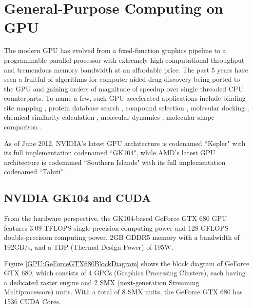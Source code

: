 \section{General-Purpose Computing on GPU}

The modern GPU has evolved from a fixed-function graphics pipeline to a programmable parallel processor with extremely high computational throughput and tremendous memory bandwidth at an affordable price. The past 5 years have seen a fruitful of algorithms for computer-aided drug discovery being ported to the GPU and gaining orders of magnitude of speedup over single threaded CPU counterparts. To name a few, such GPU-accelerated applications include binding site mapping \citep{722}, protein database search \citep{189}, compound selection \citep{750}, molecular docking \citep{723,652,779}, chemical similarity calculation \citep{726}, molecular dynamics \citep{373,374}, molecular shape comparison \citep{491}.

As of June 2012, NVIDIA’s latest GPU architecture is codenamed ``Kepler" with its full implementation codenamed ``GK104", while AMD's latest GPU architecture is codenamed ``Southern Islands" with its full implementation codenamed ``Tahiti".

\subsection{NVIDIA GK104 and CUDA}

From the hardware perspective, the GK104-based GeForce GTX 680 GPU features 3.09 TFLOPS single-precision computing power and 128 GFLOPS double-precision computing power, 2GB GDDR5 memory with a bandwidth of 192GB/s, and a TDP (Thermal Design Power) of 195W.

Figure \ref{GPU:GeForceGTX680BlockDiagram} shows the block diagram of GeForce GTX 680, which consists of 4 GPCs (Graphics Processing Clusters), each having a dedicated raster engine and 2 SMX (next-generation Streaming Multiprocessors) units. With a total of 8 SMX units, the GeForce GTX 680 has 1536 CUDA Cores.

